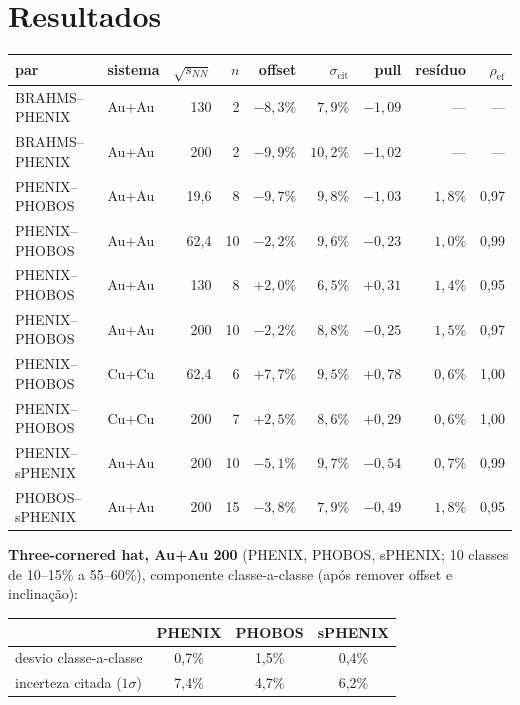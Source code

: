 \documentclass[11pt,a4paper]{article}
\begin{document}
\section*{Resultados}
\begin{tabularx}{\linewidth}{@{}l l r r r r r r r@{}}
\toprule
par & sistema & $\sqrt{s_{NN}}$ & $n$ & offset & $\sigma_{\mathrm{cit}}$ & pull & resíduo & $\rho_{\mathrm{ef}}$ \\
\midrule
BRAHMS--PHENIX & Au+Au & 130 & 2 & $-8{,}3\%$ & $7{,}9\%$ & $-1{,}09$ & --- & --- \\
BRAHMS--PHENIX & Au+Au & 200 & 2 & $-9{,}9\%$ & $10{,}2\%$ & $-1{,}02$ & --- & --- \\
PHENIX--PHOBOS & Au+Au & 19,6 & 8 & $-9{,}7\%$ & $9{,}8\%$ & $-1{,}03$ & $1{,}8\%$ & 0,97 \\
PHENIX--PHOBOS & Au+Au & 62,4 & 10 & $-2{,}2\%$ & $9{,}6\%$ & $-0{,}23$ & $1{,}0\%$ & 0,99 \\
PHENIX--PHOBOS & Au+Au & 130 & 8 & $+2{,}0\%$ & $6{,}5\%$ & $+0{,}31$ & $1{,}4\%$ & 0,95 \\
PHENIX--PHOBOS & Au+Au & 200 & 10 & $-2{,}2\%$ & $8{,}8\%$ & $-0{,}25$ & $1{,}5\%$ & 0,97 \\
PHENIX--PHOBOS & Cu+Cu & 62,4 & 6 & $+7{,}7\%$ & $9{,}5\%$ & $+0{,}78$ & $0{,}6\%$ & 1,00 \\
PHENIX--PHOBOS & Cu+Cu & 200 & 7 & $+2{,}5\%$ & $8{,}6\%$ & $+0{,}29$ & $0{,}6\%$ & 1,00 \\
PHENIX--sPHENIX & Au+Au & 200 & 10 & $-5{,}1\%$ & $9{,}7\%$ & $-0{,}54$ & $0{,}7\%$ & 0,99 \\
PHOBOS--sPHENIX & Au+Au & 200 & 15 & $-3{,}8\%$ & $7{,}9\%$ & $-0{,}49$ & $1{,}8\%$ & 0,95 \\
\bottomrule
\end{tabularx}

\textbf{Three-cornered hat, Au+Au 200} (PHENIX, PHOBOS, sPHENIX; 10 classes de 10--15\% a 55--60\%), componente
classe-a-classe (após remover offset e inclinação):
\begin{center}
\begin{tabular}{lccc}
\toprule
& PHENIX & PHOBOS & sPHENIX \\
\midrule
desvio classe-a-classe & 0,7\% & 1,5\% & 0,4\% \\
incerteza citada ($1\sigma$) & 7,4\% & 4,7\% & 6,2\% \\
\bottomrule
\end{tabular}
\end{center}
\end{document}

